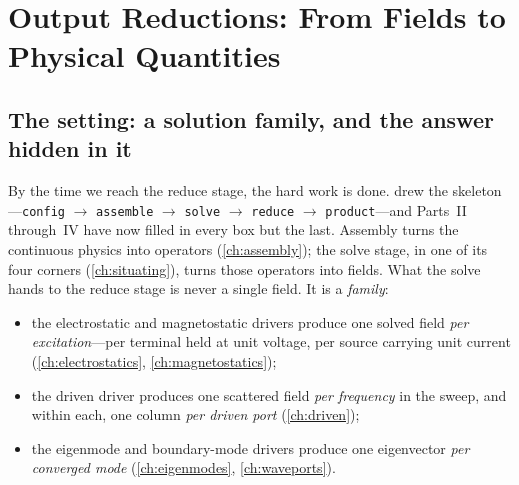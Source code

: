 \chapter{Output Reductions: From Fields to Physical Quantities}
\label{ch:reductions}


\section{The setting: a solution family, and the answer hidden in it}
\label{sec:red-setting}

By the time we reach the reduce stage, the hard work is done. 
drew the skeleton---\texttt{config} $\to$ \texttt{assemble} $\to$ \texttt{solve}
$\to$ \texttt{reduce} $\to$ \texttt{product}---and Parts~II through~IV have now
filled in every box but the last. Assembly turns the continuous physics into
operators (\cref{ch:assembly}); the solve stage, in one of its four corners
(\cref{ch:situating}), turns those operators into fields. What the solve hands
to the reduce stage is never a single field. It is a \emph{family}:

\begin{itemize}[nosep]
  \item the electrostatic and magnetostatic drivers produce one solved field
  \emph{per excitation}---per terminal held at unit voltage, per source carrying
  unit current (\cref{ch:electrostatics}, \cref{ch:magnetostatics});
  \item the driven driver produces one scattered field \emph{per frequency} in
  the sweep, and within each, one column \emph{per driven port}
  (\cref{ch:driven});
  \item the eigenmode and boundary-mode drivers produce one eigenvector
  \emph{per converged mode} (\cref{ch:eigenmodes}, \cref{ch:waveports}).
\end{itemize}

